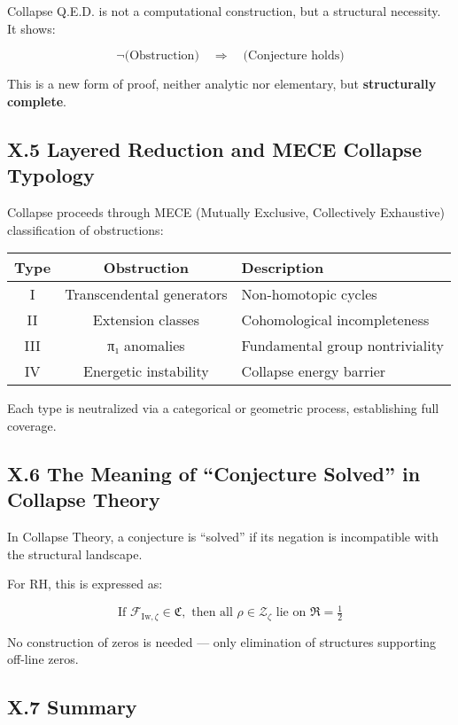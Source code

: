 \documentclass[11pt]{article}
\begin{document}
Collapse Q.E.D. is not a computational construction, but a structural necessity. It shows:

\[
\neg \text{(Obstruction)} \quad \Rightarrow \quad \text{(Conjecture holds)}
\]

This is a new form of proof, neither analytic nor elementary, but \textbf{structurally complete}.

\subsection*{X.5 Layered Reduction and MECE Collapse Typology}

Collapse proceeds through MECE (Mutually Exclusive, Collectively Exhaustive) classification of obstructions:

\begin{center}
\begin{tabular}{|c|c|l|}
\hline
Type & Obstruction & Description \\
\hline
I & Transcendental generators & Non-homotopic cycles \\
II & Extension classes & Cohomological incompleteness \\
III & π₁ anomalies & Fundamental group nontriviality \\
IV & Energetic instability & Collapse energy barrier \\
\hline
\end{tabular}
\end{center}

Each type is neutralized via a categorical or geometric process, establishing full coverage.

\subsection*{X.6 The Meaning of “Conjecture Solved” in Collapse Theory}

In Collapse Theory, a conjecture is “solved” if its negation is incompatible with the structural landscape.

For RH, this is expressed as:

\[
\text{If } \mathcal{F}_{\mathrm{Iw},\zeta} \in \mathfrak{C}, \text{ then all } \rho \in \mathcal{Z}_\zeta \text{ lie on } \Re = \tfrac{1}{2}
\]

No construction of zeros is needed — only elimination of structures supporting off-line zeros.

\subsection*{X.7 Summary}
\end{document}
